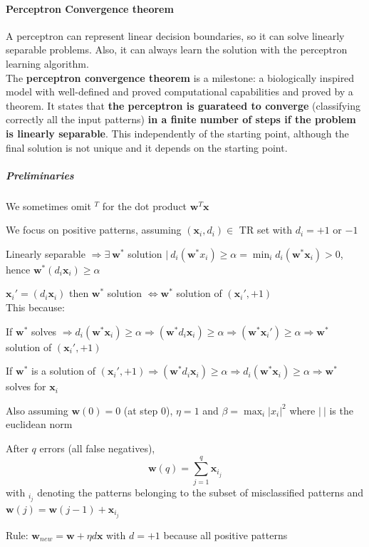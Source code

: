 \documentclass[10pt]{report}
\begin{document}
\paragraph{Perceptron Convergence theorem} A perceptron can represent linear decision boundaries, so it can solve linearly separable problems. Also, it can always learn the solution with the perceptron learning algorithm.\\
The \textbf{perceptron convergence theorem} is a milestone: a biologically inspired model with well-defined and proved computational capabilities and proved by a theorem. It states that \textbf{the perceptron is guarateed to converge} (classifying correctly all the input patterns) \textbf{in a finite number of steps if the problem is linearly separable}. This independently of the starting point, although the final solution is not unique and it depends on the starting point.
\subparagraph{Preliminaries} We sometimes omit $^T$ for the dot product $\mathbf{w}^T \mathbf{x}$
\begin{list}{}{}
	\item We focus on positive patterns, assuming $(\mathbf{x}_i, d_i)\in$ TR set with $d_i = +1$ or $-1$
	\item Linearly separable $\Rightarrow\exists\: \mathbf{w}^*$ solution $|\:d_i(\mathbf{w}^* x_i)\geq \alpha = \min_i d_i(\mathbf{w}^*\mathbf{x}_i) > 0$, hence $\mathbf{w}^*(d_i\mathbf{x}_i)\geq \alpha$
	\item $\mathbf{x}_i' = (d_i\mathbf{x}_i)$ then $\mathbf{w}^*$ solution $\Leftrightarrow \mathbf{w}^*$ solution of $(\mathbf{x}_i', +1)$\\
	This because:
	\begin{list}{}{}
		\item If $\mathbf{w}^*$ solves $\Rightarrow d_i(\mathbf{w}^*\mathbf{x}_i) \geq \alpha \Rightarrow (\mathbf{w}^*d_i\mathbf{x}_i)\geq\alpha\Rightarrow (\mathbf{w}^*\mathbf{x}_i')\geq\alpha \Rightarrow \mathbf{w}^*$ solution of $(\mathbf{x}_i', +1)$
		\item If $\mathbf{w}^*$ is a solution of $(\mathbf{x}_i', +1)\Rightarrow(\mathbf{w}^*d_i\mathbf{x}_i)\geq \alpha\Rightarrow d_i(\mathbf{w}^*\mathbf{x}_i)\geq \alpha\Rightarrow \mathbf{w}^*$ solves for $\mathbf{x}_i$
	\end{list}
	\item Also assuming $\mathbf{w}(0) = 0$ (at step $0$), $\eta = 1$ and $\beta = \max_i |x_i|^2$ where $|\:|$ is the euclidean norm
	\item After $q$ errors (all false negatives), $$\mathbf{w}(q) = \sum_{j=1}^q \mathbf{x}_{i_j}$$ with $_{i_j}$ denoting the patterns belonging to the subset of misclassified patterns and $\mathbf{w}(j) = \mathbf{w}(j-1)  + \mathbf{x}_{i_j}$
	\item Rule: $\mathbf{w}_{new} = \mathbf{w}+\eta d\mathbf{x}$ with $d=+1$ because all positive patterns
\end{list}
\end{document}
